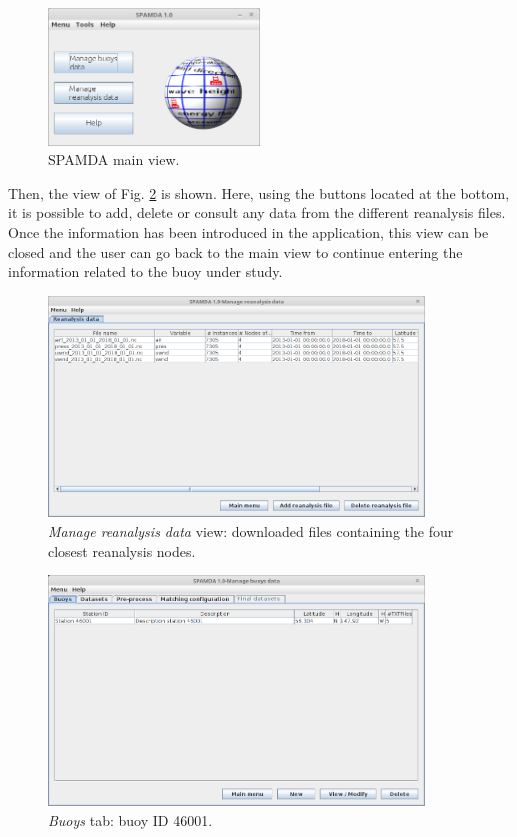 \documentclass[energies,article,submit,moreauthors,pdftex]{Definitions/mdpi}
\begin{document}
			\begin{figure}[ht]
				\centering
				\includegraphics[width=0.5\textwidth]{figures/FigureMain_view.png}
				\caption{SPAMDA main view.}\label{fig:main_view}
			\end{figure}
			
			Then, the view of Fig. \ref{fig:reanalysis} is shown. Here, using the buttons located at the bottom, it is possible to add, delete or consult any data from the different reanalysis files. Once the information has been introduced in the application, this view can be closed and the user can go back to the main view to continue entering the information related to the buoy under study. 
			
			\begin{figure}[ht!]
				\centering
				\includegraphics[width=0.89\textwidth]{figures/FigureManage_reanalysis_data.png}
				\caption{\textit{Manage reanalysis data} view: downloaded files containing the four closest reanalysis nodes.}\label{fig:reanalysis}
			\end{figure}
		
			\begin{figure}[ht!]
				\centering
				\includegraphics[width=0.89\textwidth]{figures/FigureManage_buoys.png}
				\caption{\textit{Buoys} tab: buoy ID 46001.}\label{fig:manage_buoys}
			\end{figure}
			
\end{document}
